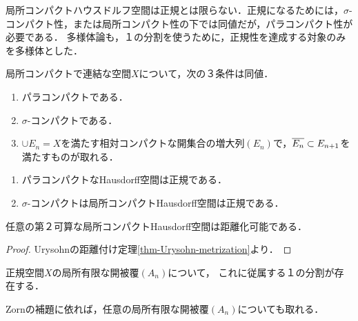 \documentclass[uplatex,dvipdfmx]{jsreport}
\begin{document}
\begin{tcolorbox}[colframe=ForestGreen, colback=ForestGreen!10!white,breakable,colbacktitle=ForestGreen!40!white,coltitle=black,fonttitle=\bfseries\sffamily,
title=]
    局所コンパクトハウスドルフ空間は正規とは限らない．正規になるためには，$\sigma$-コンパクト性，または局所コンパクト性の下では同値だが，パラコンパクト性が必要である．
    多様体論も，１の分割を使うために，正規性を達成する対象のみを多様体とした．
\end{tcolorbox}


\begin{lemma}\label{lemma-characterization-of-paracompactness}
    局所コンパクトで連結な空間$X$について，次の３条件は同値．
    \begin{enumerate}
        \item パラコンパクトである．
        \item $\sigma$-コンパクトである．
        \item $\cup E_n=X$を満たす相対コンパクトな開集合の増大列$(E_n)$で，$\overline{E_n}\subset E_{n+1}$を満たすものが取れる．
    \end{enumerate}
\end{lemma}

\begin{proposition}[正規性の十分条件]\mbox{}
    \begin{enumerate}
        \item パラコンパクトなHausdorff空間は正規である．
        \item $\sigma$-コンパクトは局所コンパクトHausdorff空間は正規である．
    \end{enumerate}
\end{proposition}

\begin{corollary}
    任意の第２可算な局所コンパクトHausdorff空間は距離化可能である．
\end{corollary}
\begin{proof}
    Urysohnの距離付け定理\ref{thm-Urysohn-metrization}より．
\end{proof}

\begin{proposition}[１の分割]
    正規空間$X$の局所有限な開被覆$(A_n)$について，
    これに従属する１の分割が存在する．
\end{proposition}
\begin{remark}
    Zornの補題に依れば，任意の局所有限な開被覆$(A_n)$についても取れる．
\end{remark}
\end{document}
